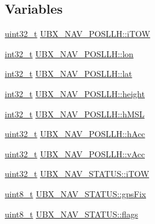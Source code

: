\subsection*{Variables}
\begin{DoxyCompactItemize}
\item 
\hyperlink{stdint_8h_a435d1572bf3f880d55459d9805097f62}{uint32\-\_\-t} \hyperlink{group___g_s_p_module_ga85f34b0228c0157d478dfcefef43096f}{U\-B\-X\-\_\-\-N\-A\-V\-\_\-\-P\-O\-S\-L\-L\-H\-::i\-T\-O\-W}
\item 
\hyperlink{group___n_a_m_e_gafd12020da5a235dfcf0c3c748fb5baed}{int32\-\_\-t} \hyperlink{group___g_s_p_module_ga754c2e4fe17d3fc6b627416bc1ff2110}{U\-B\-X\-\_\-\-N\-A\-V\-\_\-\-P\-O\-S\-L\-L\-H\-::lon}
\item 
\hyperlink{group___n_a_m_e_gafd12020da5a235dfcf0c3c748fb5baed}{int32\-\_\-t} \hyperlink{group___g_s_p_module_ga41a8c2e9da88805da15971d21c633f6f}{U\-B\-X\-\_\-\-N\-A\-V\-\_\-\-P\-O\-S\-L\-L\-H\-::lat}
\item 
\hyperlink{group___n_a_m_e_gafd12020da5a235dfcf0c3c748fb5baed}{int32\-\_\-t} \hyperlink{group___g_s_p_module_gacb639227d81a2413277fb492f6b450a0}{U\-B\-X\-\_\-\-N\-A\-V\-\_\-\-P\-O\-S\-L\-L\-H\-::height}
\item 
\hyperlink{group___n_a_m_e_gafd12020da5a235dfcf0c3c748fb5baed}{int32\-\_\-t} \hyperlink{group___g_s_p_module_gaf78fd4a28f1595624f28d0df15bfcfac}{U\-B\-X\-\_\-\-N\-A\-V\-\_\-\-P\-O\-S\-L\-L\-H\-::h\-M\-S\-L}
\item 
\hyperlink{stdint_8h_a435d1572bf3f880d55459d9805097f62}{uint32\-\_\-t} \hyperlink{group___g_s_p_module_gaf3b4eaeb1feedb8295a519b23a76bf83}{U\-B\-X\-\_\-\-N\-A\-V\-\_\-\-P\-O\-S\-L\-L\-H\-::h\-Acc}
\item 
\hyperlink{stdint_8h_a435d1572bf3f880d55459d9805097f62}{uint32\-\_\-t} \hyperlink{group___g_s_p_module_gacd74a5379c0196b551432578f7ef6e4f}{U\-B\-X\-\_\-\-N\-A\-V\-\_\-\-P\-O\-S\-L\-L\-H\-::v\-Acc}
\item 
\hyperlink{stdint_8h_a435d1572bf3f880d55459d9805097f62}{uint32\-\_\-t} \hyperlink{group___g_s_p_module_ga8413a77f5cf599f1d89fce98a304c5c1}{U\-B\-X\-\_\-\-N\-A\-V\-\_\-\-S\-T\-A\-T\-U\-S\-::i\-T\-O\-W}
\item 
\hyperlink{stdint_8h_aba7bc1797add20fe3efdf37ced1182c5}{uint8\-\_\-t} \hyperlink{group___g_s_p_module_ga9ada0b00d91062449f398439afec8e70}{U\-B\-X\-\_\-\-N\-A\-V\-\_\-\-S\-T\-A\-T\-U\-S\-::gps\-Fix}
\item 
\hyperlink{stdint_8h_aba7bc1797add20fe3efdf37ced1182c5}{uint8\-\_\-t} \hyperlink{group___g_s_p_module_ga06eed2ab154f7ab69c8a5f5acfbae99c}{U\-B\-X\-\_\-\-N\-A\-V\-\_\-\-S\-T\-A\-T\-U\-S\-::flags}

\end{DoxyCompactItemize}
